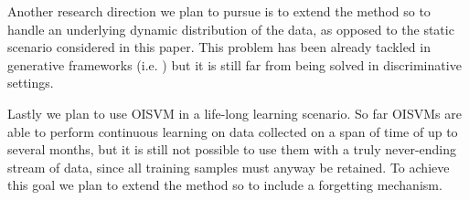 Another research direction we plan to pursue is to extend the method so to
handle an underlying dynamic distribution of the data, as opposed to the static
scenario considered in this paper. This problem has been already tackled in 
generative frameworks (i.e. \cite{YoonRDG08}) but it is still far from being solved
in discriminative settings.

Lastly we plan to use OISVM in a life-long learning scenario. So far OISVMs are
able to perform continuous learning on data collected on a span of
time of up to several months, but it is still not possible to use them
with a truly never-ending stream of data, since all training samples
must anyway be retained. To achieve this goal we plan to extend
the method so to include a forgetting mechanism.
